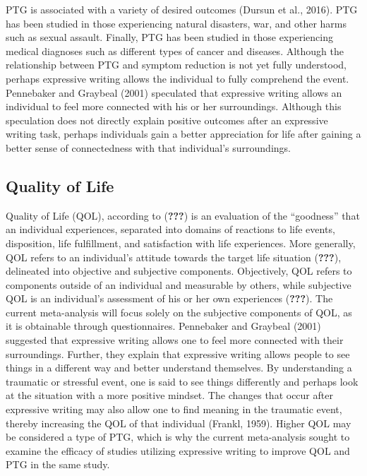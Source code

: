 \documentclass[english,man, mask]{apa6}
\theoremstyle{definition}
\theoremstyle{definition}
\theoremstyle{definition}
\theoremstyle{remark}
\begin{document}
PTG is associated with a variety of desired outcomes (Dursun et al.,
2016). PTG has been studied in those experiencing natural disasters,
war, and other harms such as sexual assault. Finally, PTG has been
studied in those experiencing medical diagnoses such as different types
of cancer and diseases. Although the relationship between PTG and
symptom reduction is not yet fully understood, perhaps expressive
writing allows the individual to fully comprehend the event. Pennebaker
and Graybeal (2001) speculated that expressive writing allows an
individual to feel more connected with his or her surroundings. Although
this speculation does not directly explain positive outcomes after an
expressive writing task, perhaps individuals gain a better appreciation
for life after gaining a better sense of connectedness with that
individual's surroundings.

\subsection{Quality of Life}\label{quality-of-life}

Quality of Life (QOL), according to ({\textbf{???}}) is an evaluation of
the \enquote{goodness} that an individual experiences, separated into
domains of reactions to life events, disposition, life fulfillment, and
satisfaction with life experiences. More generally, QOL refers to an
individual's attitude towards the target life situation
({\textbf{???}}), delineated into objective and subjective components.
Objectively, QOL refers to components outside of an individual and
measurable by others, while subjective QOL is an individual's assessment
of his or her own experiences ({\textbf{???}}). The current
meta-analysis will focus solely on the subjective components of QOL, as
it is obtainable through questionnaires. Pennebaker and Graybeal (2001)
suggested that expressive writing allows one to feel more connected with
their surroundings. Further, they explain that expressive writing allows
people to see things in a different way and better understand
themselves. By understanding a traumatic or stressful event, one is said
to see things differently and perhaps look at the situation with a more
positive mindset. The changes that occur after expressive writing may
also allow one to find meaning in the traumatic event, thereby
increasing the QOL of that individual (Frankl, 1959). Higher QOL may be
considered a type of PTG, which is why the current meta-analysis sought
to examine the efficacy of studies utilizing expressive writing to
improve QOL and PTG in the same study.
\end{document}
